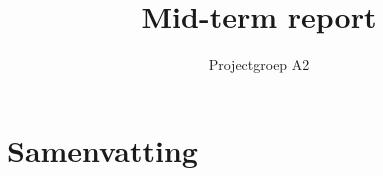\documentclass[oneside,dutch]{tudelft-report}
\begin{document}
\frontmatter

\title{Mid-term report}
\author{Projectgroep A2}
\maketitle
\tableofcontents

\chapter{Samenvatting}
\mainmatter
\end{document}
